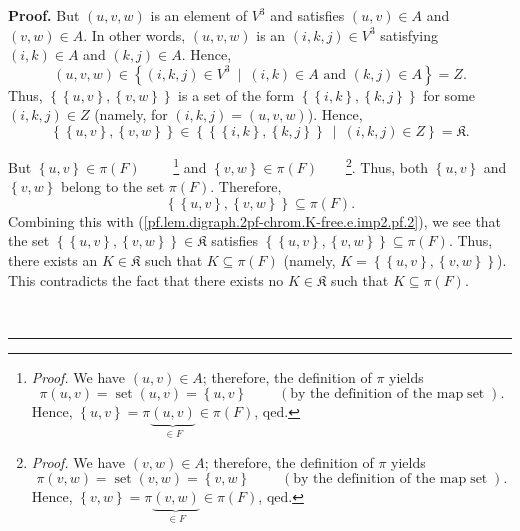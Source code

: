 \documentclass[numbers=enddot,12pt,final,onecolumn,notitlepage]{scrartcl}%
\theoremstyle{definition}
\newenvironment{proof}[1][Proof]{\noindent\textbf{#1.} }{\ \rule{0.5em}{0.5em}}
\newenvironment{verlong}{}{}
\begin{document}
\begin{verlong}
\begin{proof}
But $\left(  u,v,w\right)  $ is an element of $V^{3}$ and satisfies $\left(
u,v\right)  \in A$ and $\left(  v,w\right)  \in A$. In other words, $\left(
u,v,w\right)  $ is an $\left(  i,k,j\right)  \in V^{3}$ satisfying $\left(
i,k\right)  \in A$ and $\left(  k,j\right)  \in A$. Hence,%
\[
\left(  u,v,w\right)  \in\left\{  \left(  i,k,j\right)  \in V^{3}%
\ \mid\ \left(  i,k\right)  \in A\text{ and }\left(  k,j\right)  \in
A\right\}  =Z.
\]
Thus, $\left\{  \left\{  u,v\right\}  ,\left\{  v,w\right\}  \right\}  $ is a
set of the form $\left\{  \left\{  i,k\right\}  ,\left\{  k,j\right\}
\right\}  $ for some $\left(  i,k,j\right)  \in Z$ (namely, for $\left(
i,k,j\right)  =\left(  u,v,w\right)  $). Hence,%
\begin{equation}
\left\{  \left\{  u,v\right\}  ,\left\{  v,w\right\}  \right\}  \in\left\{
\left\{  \left\{  i,k\right\}  ,\left\{  k,j\right\}  \right\}  \ \mid
\ \left(  i,k,j\right)  \in Z\right\}  =\mathfrak{K}.
\label{pf.lem.digraph.2pf-chrom.K-free.e.imp2.pf.2}%
\end{equation}


But $\left\{  u,v\right\}  \in\pi\left(  F\right)  $%
\ \ \ \ \footnote{\textit{Proof.} We have $\left(  u,v\right)  \in A$;
therefore, the definition of $\pi$ yields%
\[
\pi\left(  u,v\right)  =\operatorname*{set}\left(  u,v\right)  =\left\{
u,v\right\}  \ \ \ \ \ \ \ \ \ \ \left(  \text{by the definition of the map
}\operatorname*{set}\right)  .
\]
Hence, $\left\{  u,v\right\}  =\pi\underbrace{\left(  u,v\right)  }_{\in F}%
\in\pi\left(  F\right)  $, qed.} and $\left\{  v,w\right\}  \in\pi\left(
F\right)  $\ \ \ \ \footnote{\textit{Proof.} We have $\left(  v,w\right)  \in
A$; therefore, the definition of $\pi$ yields%
\[
\pi\left(  v,w\right)  =\operatorname*{set}\left(  v,w\right)  =\left\{
v,w\right\}  \ \ \ \ \ \ \ \ \ \ \left(  \text{by the definition of the map
}\operatorname*{set}\right)  .
\]
Hence, $\left\{  v,w\right\}  =\pi\underbrace{\left(  v,w\right)  }_{\in F}%
\in\pi\left(  F\right)  $, qed.}. Thus, both $\left\{  u,v\right\}  $ and
$\left\{  v,w\right\}  $ belong to the set $\pi\left(  F\right)  $. Therefore,%
\[
\left\{  \left\{  u,v\right\}  ,\left\{  v,w\right\}  \right\}  \subseteq
\pi\left(  F\right)  .
\]
Combining this with (\ref{pf.lem.digraph.2pf-chrom.K-free.e.imp2.pf.2}), we
see that the set $\left\{  \left\{  u,v\right\}  ,\left\{  v,w\right\}
\right\}  \in\mathfrak{K}$ satisfies $\left\{  \left\{  u,v\right\}  ,\left\{
v,w\right\}  \right\}  \subseteq\pi\left(  F\right)  $. Thus, there exists an
$K\in\mathfrak{K}$ such that $K\subseteq\pi\left(  F\right)  $ (namely,
$K=\left\{  \left\{  u,v\right\}  ,\left\{  v,w\right\}  \right\}  $). This
contradicts the fact that there exists no $K\in\mathfrak{K}$ such that
$K\subseteq\pi\left(  F\right)  $.


\end{proof}
\end{verlong}
\end{document}
